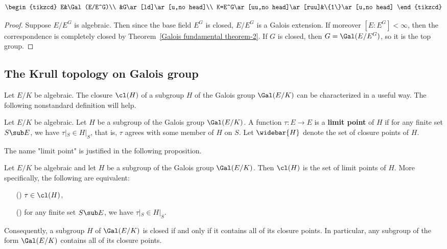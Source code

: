 \[\begin{tikzcd}
E&\Gal(E/E^G)\\
&G\ar[ld]\ar[u,no head]\\
K=E^G\ar[uu,no head]\ar[ruu]&\{1\}\ar[u,no head]
\end{tikzcd}\]
\begin{proof}
Suppose $E/E^G$ is algebraic. Then since the base field $E^G$ is closed,  $E/E^G$ is a Galois extension. If moreover $[E:E^G]<\infty$, then the correspondence is completely closed by Theorem~\ref{Galois fundamental theorem-2}. If $G$ is closed, then $G=\Gal(E/E^G)$, so it is the top group.
\end{proof}
\subsection{The Krull topology on Galois group}
Let $E/K$ be algebraic. The closure $\cl(H)$ of a subgroup $H$ of the Galois group $\Gal(E/K)$ can be characterized in a useful way. The following nonstandard definition will help.
\begin{definition}
Let $E/K$ be algebraic. Let $H$ be a subgroup of the Galois group $\Gal(E/K)$. A function $\tau:E\to E$ is a \textbf{limit point} of $H$ if for any finite set $S\sub E$, we have $\tau|_S\in H|_S$, that is, $\tau$ agrees with some member of $H$ on $S$. Let $\widebar{H}$ denote the set of closure points of $H$.
\end{definition}
The name "limit point" is justified in the following proposition.
\begin{proposition}\label{Galois closure is limit point}
Let $E/K$ be algebraic and let $H$ be a subgroup of the Galois group $\Gal(E/K)$. Then $\cl(H)$ is the set of limit points of $H$. More specifically,
the following are equivalent:
\begin{itemize}
\item[(\rmnum{1})] $\tau\in\cl(H)$,
\item[(\rmnum{2})] for any finite set $S\sub E$, we have $\tau|_S\in H|_S$.
\end{itemize}
Consequently, a subgroup $H$ of $\Gal(E/K)$ is closed if and only if it contains all of its closure points. In particular, any subgroup of the form $\Gal(E/K)$ contains all of its closure points.
\end{proposition}
